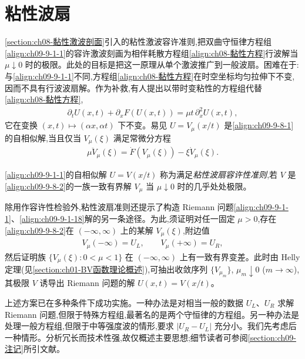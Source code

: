\documentclass[../../main.tex]{subfiles}
\begin{document}
\section{粘性波扇}\label{section:ch09-粘性波扇}

\cref{section:ch08-黏性激波剖面}引入的粘性激波容许准则,把双曲守恒律方程组\eqref{align:ch09-9-1-1}的容许激波刻画为相伴耗散方程组\eqref{align:ch08-黏性方程}行波解当 $\mu\downarrow0$ 时的极限。此处的目标是把这一原理从单个激波推广到一般波扇。困难在于:与\eqref{align:ch09-9-1-1}不同,方程组\eqref{align:ch08-黏性方程}在时空坐标均匀拉伸下不变,因而不具有行波波扇解。作为补救,有人提出以带时变粘性的方程组代替\eqref{align:ch08-黏性方程},
\begin{align}
\partial_{t}U(x,t)+\partial_{x}F(U(x,t))=\mu t\,\partial_{x}^{2}U(x,t),
\label{align:ch09-9-8-1}
\end{align}
它在变换 $(x,t)\mapsto(\alpha x,\alpha t)$ 下不变。易见 $U=V_{\mu}(x/t)$ 是\eqref{align:ch09-9-8-1}的自相似解,当且仅当 $V_{\mu}(\xi)$ 满足常微分方程
\begin{align}
\mu\ddot{V}_{\mu}(\xi)=\dot{F}(V_{\mu}(\xi))-\xi\dot{V}_{\mu}(\xi).
\label{align:ch09-9-8-2}
\end{align}

\eqref{align:ch09-9-1-1}的自相似解 $U=V(x/t)$ 称为满足\emph{粘性波扇容许性准则},若 $V$ 是\eqref{align:ch09-9-8-2}的一族一致有界解 $V_{\mu}$ 当 $\mu\downarrow0$ 时的几乎处处极限。

除用作容许性检验外,粘性波扇准则还提示了构造 Riemann 问题\eqref{align:ch09-9-1-1}、\eqref{align:ch09-9-1-18}解的另一条途径。为此,须证明对任一固定 $\mu>0$,存在\eqref{align:ch09-9-8-2}在 $(-\infty,\infty)$ 上的某解 $V_{\mu}(\xi)$,附边值
\begin{align}
V_{\mu}(-\infty)=U_{L},\qquad V_{\mu}(+\infty)=U_{R},
\label{align:ch09-9-8-3}
\end{align}
然后证明族 $\{V_{\mu}(\xi):0<\mu<1\}$ 在 $(-\infty,\infty)$ 上有一致有界变差。此时由 Helly 定理(见\cref{section:ch01-BV函数理论概述}),可抽出收敛序列 $\{V_{\mu_{m}}\}$, $\mu_{m}\downarrow0$ ($m\to\infty$),其极限 $V$ 诱导出 Riemann 问题的解 $U(x,t)=V(x/t)$。

上述方案已在多种条件下成功实施。一种办法是对相当一般的数据 $U_{L}$、$U_{R}$ 求解 Riemann 问题,但限于特殊方程组,最著名的是两个守恒律的方程组。另一种办法是处理一般方程组,但限于中等强度波的情形,要求 $|U_{R}-U_{L}|$ 充分小。我们先考虑后一种情形。分析冗长而技术性强,故仅概述主要思想;细节读者可参阅\cref{section:ch09-注记}所引文献。
\end{document}
